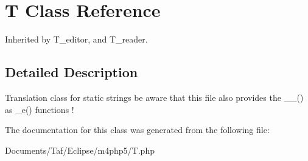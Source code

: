 \hypertarget{classT}{
\section{T Class Reference}
\label{classT}
}
Inherited by T\_\-editor, and T\_\-reader.



\subsection{Detailed Description}
Translation class for static strings be aware that this file also provides the \_\-\_\-() as \_\-e() functions ! 

The documentation for this class was generated from the following file:\begin{CompactItemize}
\item 
Documents/Taf/Eclipse/m4php5/T.php\end{CompactItemize}
